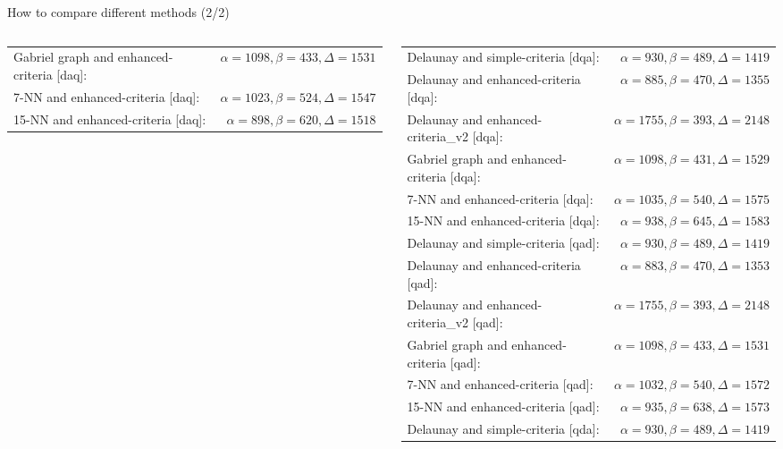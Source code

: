 \begin{frame}{How to compare different methods (2/2)}
\begin{table}[!ht]
\begin{columns}
\begin{column}{0.5\paperwidth}
\begin{tabular}{lr}
                    Gabriel graph and enhanced-criteria [daq]: & $\alpha = 1098, \beta = 433, \Delta = 1531$\\
                    7-NN and enhanced-criteria [daq]: & $\alpha = 1023, \beta = 524, \Delta = 1547$\\
                    15-NN and enhanced-criteria [daq]: & $\alpha = 898, \beta = 620, \Delta = 1518$\\
                \end{tabular}
            \end{column}
            \begin{column}{0.5\paperwidth}
                \begin{tabular}{lr}
                    Delaunay and simple-criteria [dqa]: & $\alpha = 930, \beta = 489, \Delta = 1419$\\
                    Delaunay and enhanced-criteria [dqa]: & $\alpha = 885, \beta = 470, \Delta = 1355$\\
                    Delaunay and enhanced-criteria\_v2 [dqa]: & $\alpha = 1755, \beta = 393, \Delta = 2148$\\
                    Gabriel graph and enhanced-criteria [dqa]: & $\alpha = 1098, \beta = 431, \Delta = 1529$\\
                    7-NN and enhanced-criteria [dqa]: & $\alpha = 1035, \beta = 540, \Delta = 1575$\\
                    15-NN and enhanced-criteria [dqa]: & $\alpha = 938, \beta = 645, \Delta = 1583$\\
                    \hline
                    Delaunay and simple-criteria [qad]: & $\alpha = 930, \beta = 489, \Delta = 1419$\\
                    Delaunay and enhanced-criteria [qad]: & $\alpha = 883, \beta = 470, \Delta = 1353$\\
                    Delaunay and enhanced-criteria\_v2 [qad]: & $\alpha = 1755, \beta = 393, \Delta = 2148$\\
                    Gabriel graph and enhanced-criteria [qad]: & $\alpha = 1098, \beta = 433, \Delta = 1531$\\
                    7-NN and enhanced-criteria [qad]: & $\alpha = 1032, \beta = 540, \Delta = 1572$\\
                    15-NN and enhanced-criteria [qad]: & $\alpha = 935, \beta = 638, \Delta = 1573$\\
                    \hline
                    Delaunay and simple-criteria [qda]: & $\alpha = 930, \beta = 489, \Delta = 1419$\\

\end{tabular}
\end{column}
\end{columns}
\end{table}
\end{frame}
